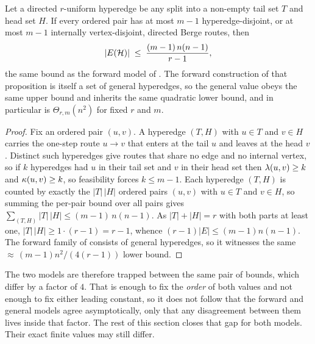 \begin{proposition}\label{prop:dir-hyper-general}
Let a directed $r$-uniform hyperedge be any split into a non-empty tail set $T$ and
head set $H$. If every ordered pair has at most $m-1$ hyperedge-disjoint, or at most
$m-1$ internally vertex-disjoint, directed Berge routes, then
\[
    |E(\mathcal{H})| \;\le\; \frac{(m-1)\,n(n-1)}{r-1},
\]
the same bound as the forward model of . The forward
construction of that proposition is itself a set of general hyperedges, so the
general value obeys the same upper bound and inherits the same quadratic lower
bound, and in particular is $\Theta_{r,m}(n^2)$ for fixed $r$ and $m$.
\end{proposition}

\begin{proof}
Fix an ordered pair $(u, v)$. A hyperedge $(T, H)$ with $u \in T$ and $v \in H$
carries the one-step route $u \to v$ that enters at the tail $u$ and leaves at the
head $v$. Distinct such hyperedges give routes that share no edge and no internal
vertex, so if $k$ hyperedges had $u$ in their tail set and $v$ in their head set
then $\lambda(u, v) \ge k$ and $\kappa(u, v) \ge k$, so feasibility forces $k \le m-1$.
Each hyperedge $(T, H)$ is counted by exactly the $|T|\,|H|$ ordered pairs $(u, v)$
with $u \in T$ and $v \in H$, so summing the per-pair bound over all pairs gives
$\sum_{(T,H)} |T|\,|H| \le (m-1)\,n(n-1)$. As $|T| + |H| = r$ with both parts at
least one, $|T|\,|H| \ge 1 \cdot (r-1) = r-1$, whence $(r-1)|E| \le (m-1)n(n-1)$.
The forward family of  consists of general hyperedges,
so it witnesses the same ${\approx}\,(m-1)n^2/(4(r-1))$ lower bound.
\end{proof}

The two models are therefore trapped between the same pair of bounds, which
differ by a factor of $4$. That is enough to fix the \emph{order} of both values
and not enough to fix either leading constant, so it does not follow that the
forward and general models agree asymptotically, only that any disagreement
between them lives inside that factor. The rest of this section closes that gap
for both models. Their exact finite values may still differ.

